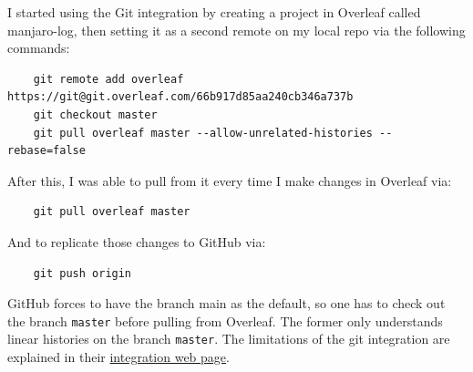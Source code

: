 \documentclass[]{scrartcl}
\begin{document}
I started using the Git integration by creating a project in Overleaf called manjaro-log, then setting it as a second remote on my local repo via the following commands:

\begin{verbatim}
    git remote add overleaf https://git@git.overleaf.com/66b917d85aa240cb346a737b
    git checkout master
    git pull overleaf master --allow-unrelated-histories --rebase=false
\end{verbatim}

After this, I was able to pull from it every time I make changes in Overleaf via:

\begin{verbatim}
    git pull overleaf master
\end{verbatim}

And to replicate those changes to GitHub via:

\begin{verbatim}
    git push origin
\end{verbatim}


GitHub forces to have the branch main as the default, so one has to check out the branch \texttt{master} before pulling from Overleaf. 
The former only understands linear histories on the branch \texttt{master}.
The limitations of the git integration are explained in their \href{https://www.overleaf.com/learn/how-to/Git_integration}{integration web page}.  
\end{document}
